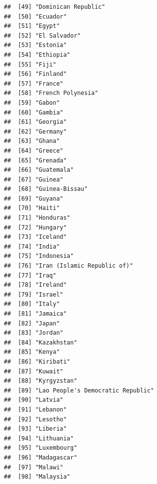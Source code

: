 \documentclass[]{article}
\begin{document}
\begin{verbatim}
##  [49] "Dominican Republic"                       
##  [50] "Ecuador"                                  
##  [51] "Egypt"                                    
##  [52] "El Salvador"                              
##  [53] "Estonia"                                  
##  [54] "Ethiopia"                                 
##  [55] "Fiji"                                     
##  [56] "Finland"                                  
##  [57] "France"                                   
##  [58] "French Polynesia"                         
##  [59] "Gabon"                                    
##  [60] "Gambia"                                   
##  [61] "Georgia"                                  
##  [62] "Germany"                                  
##  [63] "Ghana"                                    
##  [64] "Greece"                                   
##  [65] "Grenada"                                  
##  [66] "Guatemala"                                
##  [67] "Guinea"                                   
##  [68] "Guinea-Bissau"                            
##  [69] "Guyana"                                   
##  [70] "Haiti"                                    
##  [71] "Honduras"                                 
##  [72] "Hungary"                                  
##  [73] "Iceland"                                  
##  [74] "India"                                    
##  [75] "Indonesia"                                
##  [76] "Iran (Islamic Republic of)"               
##  [77] "Iraq"                                     
##  [78] "Ireland"                                  
##  [79] "Israel"                                   
##  [80] "Italy"                                    
##  [81] "Jamaica"                                  
##  [82] "Japan"                                    
##  [83] "Jordan"                                   
##  [84] "Kazakhstan"                               
##  [85] "Kenya"                                    
##  [86] "Kiribati"                                 
##  [87] "Kuwait"                                   
##  [88] "Kyrgyzstan"                               
##  [89] "Lao People's Democratic Republic"         
##  [90] "Latvia"                                   
##  [91] "Lebanon"                                  
##  [92] "Lesotho"                                  
##  [93] "Liberia"                                  
##  [94] "Lithuania"                                
##  [95] "Luxembourg"                               
##  [96] "Madagascar"                               
##  [97] "Malawi"                                   
##  [98] "Malaysia"                                 

\end{verbatim}
\end{document}
